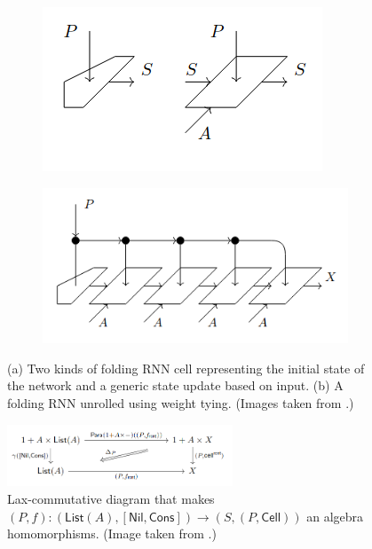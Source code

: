 \documentclass[11pt,a4paper,openright,twoside]{report}
\theoremstyle{plain}
\theoremstyle{definition}
\begin{document}
\begin{figure}[h]
  \begin{center}
    \begin{subfigure}{0.3\textwidth}
      \includegraphics[width=\textwidth]{figures/folding_rnn_cell.png}
      \caption{}
    \end{subfigure}
    \begin{subfigure}{0.48\textwidth}
      \includegraphics[width=\textwidth]{figures/folding_rnn.png}
      \caption{}
    \end{subfigure}            
    \caption[Folding RNN]{(a) Two kinds of folding RNN cell representing the initial state of the network and a generic state update based on input. (b) A folding RNN unrolled using weight tying. (Images taken from \cite{gavranovicposition}.)}
    \label{fig: foldingrnn}
  \end{center}
\end{figure}

\begin{figure}[h]
  \begin{center}
    \includegraphics[width=0.6\textwidth]{figures/folding_rnn_lax_diagram.png}     
    \caption[Lax-commutative diagram for the unrolling of a folding RNN]{ Lax-commutative diagram that makes $(P,f): (\mathsf{List}(A), [\mathsf{Nil}, \mathsf{Cons}]) \to (S,(P,\mathsf{Cell}))$ an algebra homomorphisms. (Image taken from \cite{gavranovicposition}.)}
    \label{fig: foldingrnncommdiag}
  \end{center}
\end{figure}
\end{document}
